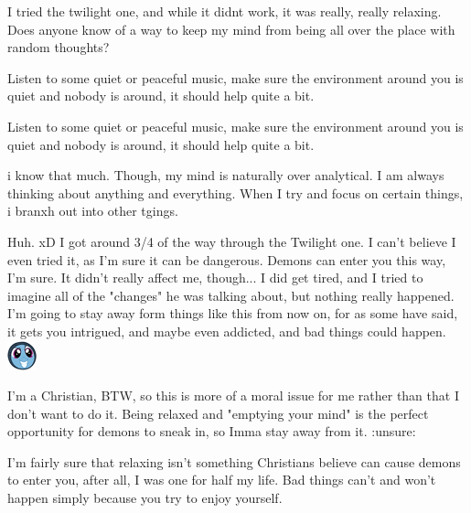 \documentclass[ebook,12pt,oneside,openany]{memoir}
\newcommand{\mytexttilde}{\raisebox{0.5ex}{\texttildelow}}
\begin{document}
\begin{tcolorbox}[title=The Original,colback=green!5!white,colframe=green!75!black,coltitle=white]
\begin{tcolorbox}[title=TheBronyHeart]
\par{I tried the twilight one, and while it didnt work, it was really, really relaxing. Does anyone know of a way to keep my mind from being all over the place with random thoughts?}
\end{tcolorbox}
\par{Listen to some quiet or peaceful music, make sure the environment around you is quiet and nobody is around, it should help quite a bit.}
\end{tcolorbox}
\begin{tcolorbox}[title=Delete this account,colback=purple!5!white,colframe=purple!75!black,coltitle=white]
\begin{tcolorbox}[title=Ponyworld Destroyer]
Listen to some quiet or peaceful music, make sure the environment around you is quiet and nobody is around, it should help quite a bit.\end{tcolorbox}
i know that much. Though, my mind is naturally over analytical. I am always thinking about anything and everything. When I try and focus on certain things, i branxh out into other tgings.\end{tcolorbox}
\begin{tcolorbox}[title=Harmonic Revelations,colback=brown!5!white,colframe=brown!75!black,coltitle=white]
\begin{tcolorbox}[title=\mytexttilde{}Chaotic Chicken\mytexttilde{}]
\par{Huh. xD I got around 3/4 of the way through the Twilight one. I can't believe I even tried it, as I'm sure it can be dangerous. Demons can enter you this way, I'm sure. It didn't really affect me, though... I did get tired, and I tried to imagine all of the "changes" he was talking about, but nothing really happened. I'm going to stay away form things like this from now on, for as some have said, it gets you intrigued, and maybe even addicted, and bad things could happen.  \includegraphics{images/mlp_PR6Zd18.png}}
\newline{}
\par{I'm a Christian, BTW, so this is more of a moral issue for me rather than that I don't want to do it. Being relaxed and "emptying your mind" is the perfect opportunity for demons to sneak in, so Imma stay away from it. :unsure:}
\end{tcolorbox}
\par{I'm fairly sure that relaxing isn't something Christians believe can cause demons to enter you, after all, I was one for half my life. Bad things can't and won't happen simply because you try to enjoy yourself.}
\end{tcolorbox}
\end{document}
